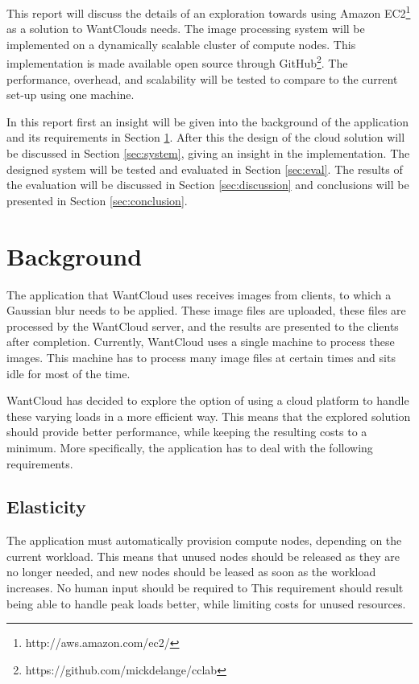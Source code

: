 \documentclass{acm_proc_article-sp}
\begin{document}
This report will discuss the details of an exploration towards using Amazon EC2\footnote{http://aws.amazon.com/ec2/} as a solution to WantClouds needs.
The image processing system will be implemented on a dynamically scalable cluster of compute nodes.
This implementation is made available open source through GitHub\footnote{https://github.com/mickdelange/cclab}.
The performance, overhead, and scalability will be tested to compare to the current set-up using one machine.

In this report first an insight will be given into the background of the application and its requirements in Section \ref{sec:bg}.
After this the design of the cloud solution will be discussed in Section \ref{sec:system}, giving an insight in the implementation.
The designed system will be tested and evaluated in Section \ref{sec:eval}.
The results of the evaluation will be discussed in Section \ref{sec:discussion} and conclusions will be presented in Section \ref{sec:conclusion}.

\section{Background}
\label{sec:bg}
The application that WantCloud uses receives images from clients, to which a Gaussian blur needs to be applied.
These image files are uploaded, these files are processed by the WantCloud server, and the results are presented to the clients after completion.
Currently, WantCloud uses a single machine to process these images.
This machine has to process many image files at certain times and sits idle for most of the time.

WantCloud has decided to explore the option of using a cloud platform to handle these varying loads in a more efficient way.
This means that the explored solution should provide better performance, while keeping the resulting costs to a minimum.
More specifically, the application has to deal with the following requirements.

\subsection{Elasticity}
The application must automatically provision compute nodes, depending on the current workload.
This means that unused nodes should be released as they are no longer needed, and new nodes should be leased as soon as the workload increases.
No human input should be required to 
This requirement should result being able to handle peak loads better, while limiting costs for unused resources.
\end{document}
